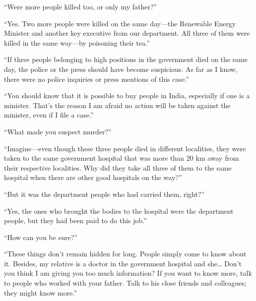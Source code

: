 “Were more people killed too, or only my father?”

“Yes. Two more people were killed on the same day—the Renewable Energy
Minister and another key executive from our department. All three of them were
killed in the same way—by poisoning their tea.”

“If three people belonging to high positions in the government died on the same
day, the police or the press should have become suspicious. As far as I know,
there were no police inquiries or press mentions of this case.”

“You should know that it is possible to buy people in India, especially if one
is a minister. That's the reason I am afraid no action will be taken against the
minister, even if I file a case.”

“What made you suspect murder?”

“Imagine—even though these three people died in different localities, they
were taken to the same government hospital that was more than 20 km away from
their respective localities. Why did they take all three of them to the same
hospital when there are other good hospitals on the way?”

“But it was the department people who had carried them, right?”

“Yes, the ones who brought the bodies to the hospital were the department
people, but they had been paid to do this job.”

“How can you be sure?”

“These things don't remain hidden for long. People simply come to know about it.
Besides, my relative is a doctor in the government hospital and she… Don't
you think I am giving you too much information? If you want to know more, talk
to people who worked with your father. Talk to his close friends and colleagues; they might know more.”